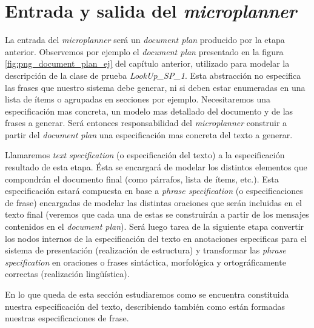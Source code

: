 

\section{Entrada y salida del \textit{microplanner}}
La entrada del \textit{microplanner} será un \textit{document plan} producido por la etapa anterior. Observemos por ejemplo el \textit{document plan} presentado en la figura \ref{fig:png_document_plan_ej} del capítulo anterior, utilizado para modelar la descripción de la clase de prueba \emph{LookUp\_SP\_1}. Esta abstracción no especifica las frases que nuestro sistema debe generar, ni si deben estar enumeradas en una lista de ítems o agrupadas en secciones por ejemplo. Necesitaremos una especificación mas concreta, un modelo mas detallado del documento y de las frases a generar. Será entonces responsabilidad del \textit{microplanner}  construir a partir del \textit{document plan} una especificación mas concreta del texto a generar.

Llamaremos \emph{text specification} (o especificación del texto) a la especificación resultado de esta etapa. Ésta se encargará de modelar los distintos elementos que compondrán el documento final (como párrafos, lista de ítems, etc.). Esta especificación estará compuesta en base a \textit{phrase specification} (o especificaciones de frase) encargadas de modelar las distintas oraciones que serán incluidas en el texto final (veremos que cada una de estas se construirán a partir de los mensajes contenidos en el \textit{document plan}). Será luego tarea de la siguiente etapa convertir los nodos internos de la especificación del texto en anotaciones especificas para el sistema de presentación (realización de estructura) y transformar las \emph{phrase specification} en oraciones o frases sintáctica, morfológica y ortográficamente correctas (realización lingüística). 


En lo que queda de esta sección estudiaremos como se encuentra constituida nuestra especificación del texto, describiendo también como están formadas nuestras especificaciones de frase.

